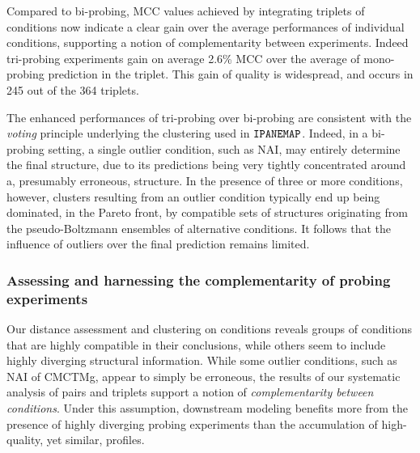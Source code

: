 \documentclass[a4,center,fleqn]{NAR}
\newcommand{\Software}[1]{$\text{\ttfamily #1}$}
\newcommand{\OurTool}{\Software{IPANEMAP}\xspace}
\newcommand{\Def}[1]{{\em #1}}
\begin{document}
Compared to bi-probing, MCC values achieved by integrating triplets of conditions now indicate a clear gain over the average performances of individual conditions, supporting a notion of complementarity between experiments. Indeed tri-probing experiments gain on average 2.6\% MCC over the average of mono-probing prediction in the triplet. This gain of quality is widespread, and occurs in 245 out of the 364 triplets. 

The enhanced performances of tri-probing over bi-probing are consistent with the \emph{voting} principle underlying the clustering used in \OurTool. Indeed, in a bi-probing setting, a single outlier condition, such as NAI, may entirely determine the final structure, due to its predictions being very tightly concentrated around a, presumably erroneous, structure. In the presence of three or more conditions, however, clusters resulting from an outlier condition typically end up being dominated, in the Pareto front, by compatible sets of structures originating from the pseudo-Boltzmann ensembles of alternative conditions. It follows that the influence of outliers over the final prediction remains limited.


\subsubsection{Assessing and harnessing the complementarity of probing experiments}
Our distance assessment and clustering on conditions reveals groups of conditions that are highly compatible in their conclusions, while others seem to include highly diverging structural information. While some outlier conditions, such as NAI of CMCTMg, appear to simply be erroneous, the results of our systematic analysis of pairs and triplets support a notion of \Def{complementarity between conditions}. Under this assumption, downstream modeling benefits more from the presence of highly diverging probing experiments than the accumulation of high-quality, yet similar, profiles.
\end{document}
